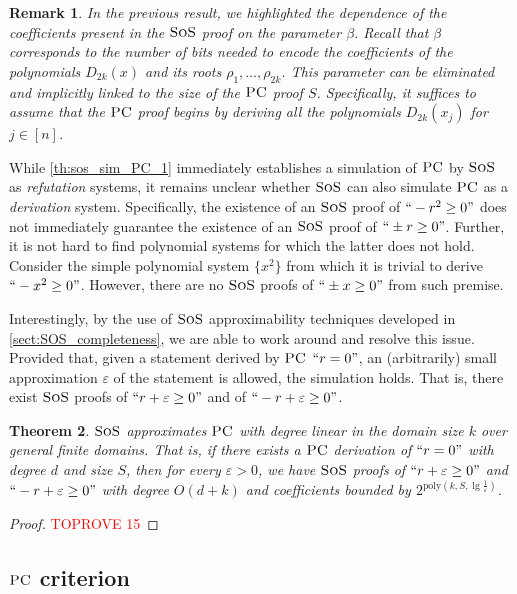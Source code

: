 \documentclass[11pt]{article}
\newcommand{\sos}{\text{\sc{SoS}}}
\newcommand{\PC}{\textsc{PC}}
\newcommand{\1}{\textbf{1}}
\newtheorem{theorem}{Theorem}[section]
\newtheorem{remark}[theorem]{Remark}
\begin{document}
\begin{remark}
   In the previous result, we highlighted the dependence of the coefficients present in the $\sos$ proof on the parameter $\beta$. Recall that $\beta$ corresponds to the number of bits needed to encode the coefficients of the polynomials $D_{2k}(x)$ and its roots $\rho_1, \dots, \rho_{2k}$. This parameter can be eliminated and implicitly linked to the size of the $\PC$ proof $S$. Specifically, it suffices to assume that the $\PC$ proof begins by deriving all the polynomials $D_{2k}(x_j)$ for $j \in [n]$.
\end{remark}

While \cref{th:sos_sim_PC_1} immediately establishes a simulation of $\PC$ by $\sos$ as \emph{refutation} systems, it remains unclear whether $\sos$ can also simulate $\PC$ as a \emph{derivation} system. Specifically, the existence of an $\sos$ proof of $``-r^2 \geq 0"$ does not immediately guarantee the existence of an $\sos$ proof of $``\pm r \geq 0"$. Further, it is not hard to find polynomial systems for which the latter does not hold. Consider the simple polynomial system $\{ x^2\}$ from which it is trivial to derive $``-x^2 \geq 0"$. However, there are no $\sos$ proofs of $``\pm x \geq 0"$ from such premise.

Interestingly, by the use of $\sos$ approximability techniques developed in \cref{sect:SOS_completeness}, we are able to work around and resolve this issue. Provided that, given a statement derived by $\PC$ $``r = 0"$, an (arbitrarily) small approximation $\varepsilon$ of the statement is allowed, the simulation holds. That is, there exist $\sos$ proofs of $`` r + \varepsilon \geq 0"$ and of $``- r + \varepsilon \geq 0"$.

\begin{theorem}\label{th:sospc}
    $\sos$ \emph{approximates} $\PC$ with degree linear in the domain size $k$ over general finite domains. That is, if there exists a \(\PC\) derivation of \( ``r=0" \) with degree \( d \) and size \( S \), then for every \( \varepsilon > 0 \), we have \(\sos\) proofs of \( ``r+\varepsilon \geq 0" \) and \( ``-r+\varepsilon \geq 0" \) with degree \( O(d+k) \) and coefficients bounded by \( 2^{\text{poly}(k, S, \lg \frac{1}{\varepsilon})} \).
\end{theorem}

\begin{proof}\textcolor{red}{TOPROVE 15}\end{proof}

\subsection[PC criterion]{$\PC$ criterion}\label{sect:pc_crit}
\end{document}
